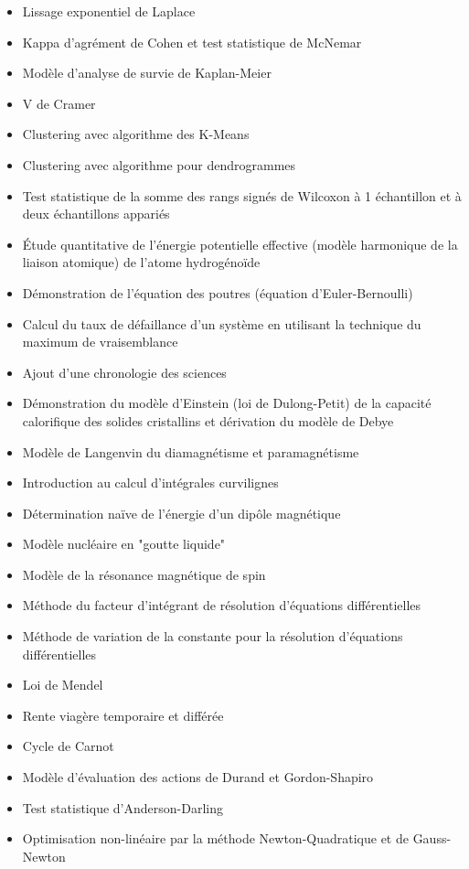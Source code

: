 \begin{itemize}
\begin{itemize}[noitemsep]
				\item Lissage exponentiel de Laplace
				\item Kappa d'agrément de Cohen et test statistique de McNemar
				\item Modèle d'analyse de survie de Kaplan-Meier
				\item V de Cramer
				\item Clustering avec algorithme des K-Means
				\item Clustering avec algorithme pour dendrogrammes
				\item Test statistique de la somme des rangs signés de Wilcoxon à 1 échantillon et à deux échantillons appariés
				\item Étude quantitative de l'énergie potentielle effective (modèle harmonique de la liaison atomique) de l'atome hydrogénoïde
				\item Démonstration de l'équation des poutres (équation d'Euler-Bernoulli)
				\item Calcul du taux de défaillance d'un système en utilisant la technique du maximum de vraisemblance
				\item Ajout d'une chronologie des sciences
				\item Démonstration du modèle d'Einstein (loi de Dulong-Petit) de la capacité calorifique des solides cristallins et dérivation du modèle de Debye
				\item Modèle de Langenvin du diamagnétisme et paramagnétisme
				\item Introduction au calcul d'intégrales curvilignes
				\item Détermination naïve de l'énergie d'un dipôle magnétique
				\item Modèle nucléaire en "goutte liquide"
				\item Modèle de la résonance magnétique de spin
				\item Méthode du facteur d'intégrant de résolution d'équations différentielles
				\item Méthode de variation de la constante pour la résolution d'équations différentielles
				\item Loi de Mendel
				\item Rente viagère temporaire et différée
				\item Cycle de Carnot
				\item Modèle d'évaluation des actions de Durand et Gordon-Shapiro
				\item Test statistique d'Anderson-Darling
				\item Optimisation non-linéaire par la méthode Newton-Quadratique et de Gauss-Newton

\end{itemize}
\end{itemize}
